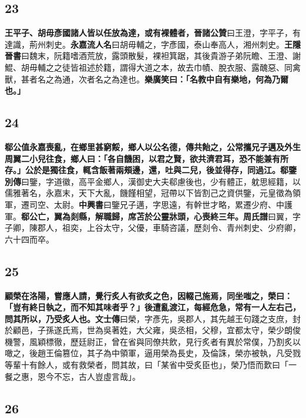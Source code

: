 \subsection*{23}

\textbf{王平子、胡毋彥國諸人皆以任放為達，或有裸體者，}{\footnotesize \textbf{晉諸公贊}曰王澄，字平子，有達識，荊州刺史。\textbf{永嘉流人名}曰胡毋輔之，字彥國，泰山奉高人，湘州刺史。\textbf{王隱晉書}曰魏末，阮籍嗜酒荒放，露頭散髮，裸袒箕踞，其後貴游子弟阮瞻、王澄、謝鯤、胡毋輔之之徒皆祖述於籍，謂得大道之本，故去巾幘、脫衣服、露醜惡、同禽獸，甚者名之為通，次者名之為達也。}\textbf{樂廣笑曰：「名教中自有樂地，何為乃爾也。」}

\subsection*{24}

\textbf{郗公值永嘉喪亂，在鄉里甚窮餒，鄉人以公名德，傳共飴之，公常攜兄子邁及外生周翼二小兒往食，鄉人曰：「各自饑困，以君之賢，欲共濟君耳，恐不能兼有所存。」公於是獨往食，輒含飯著兩頰邊，還，吐與二兒，後並得存，同過江。}{\footnotesize \textbf{郗鑒別傳}曰鑒，字道徽，高平金鄉人，漢御史大夫郗慮後也，少有體正，躭思經籍，以儒雅著名，永嘉末，天下大亂，饑饉相望，冠帶以下皆割己之資供鑒，元皇徵為領軍，遷司空、太尉。\textbf{中興書}曰鑒兄子邁，字思遠，有幹世才略，累遷少府、中護軍。}\textbf{郗公亡，翼為剡縣，解職歸，席苫於公靈牀頭，心喪終三年。}{\footnotesize \textbf{周氏譜}曰翼，字子卿，陳郡人，祖奕，上谷太守，父優，車騎咨議，歷剡令、青州刺史、少府卿，六十四而卒。}

\subsection*{25}

\textbf{顧榮在洛陽，嘗應人請，覺行炙人有欲炙之色，因輟己施焉，同坐嗤之，榮曰：「豈有終日執之，而不知其味者乎？」後遭亂渡江，每經危急，常有一人左右己，問其所以，乃受炙人也。}{\footnotesize \textbf{文士傳}曰榮，字彥先，吳郡人，其先越王句踐之支庶，封於顧邑，子孫遂氏焉，世為吳著姓，大父雍，吳丞相，父穆，宜都太守，榮少朗俊機警，風穎標徹，歷廷尉正，曾在省與同僚共飲，見行炙者有異於常僕，乃割炙以噉之，後趙王倫篡位，其子為中領軍，逼用榮為長史，及倫誅，榮亦被執，凡受戮等輩十有餘人，或有救榮者，問其故，曰「某省中受炙臣也」，榮乃悟而歎曰「一餐之惠，恩今不忘，古人豈虛言哉」。}

\subsection*{26}

